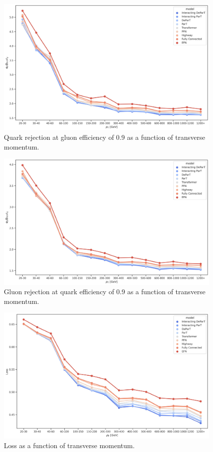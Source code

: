 \begin{figure}[htb]
    \centering
    \includegraphics[width=0.95\linewidth]{src/plots/results/pT_dep/quark_rej_at_gluon_eff_0.9.jpg}
    \caption{Quark rejection at gluon efficiency of 0.9 as a function of transverse momentum.}
    \label{fig:quark_rej_at_gluon_eff_0.9_pt}
\end{figure}

\begin{figure}[htb]
    \centering
    \includegraphics[width=0.95\linewidth]{src/plots/results/pT_dep/gluon_rej_at_quark_eff_0.9.jpg}
    \caption{Gluon rejection at quark efficiency of 0.9 as a function of transverse momentum.}
    \label{fig:gluon_rej_at_quark_eff_0.9_pt}
\end{figure}

\begin{figure}[htb]
    \centering
    \includegraphics[width=0.95\linewidth]{src/plots/results/pT_dep/loss.jpg}
    \caption{Loss as a function of transverse momentum.}
    \label{fig:loss_pt}
\end{figure}

